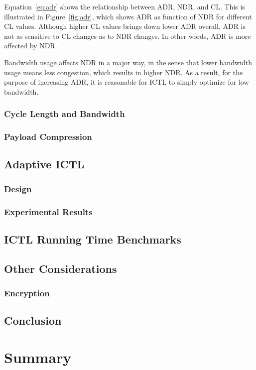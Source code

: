 \documentclass[12pt]{report}
\begin{document}
Equation~\ref{eq:adr} shows the relationship between ADR, NDR, and CL. This is illustrated in Figure~\ref{fig:adr}, which shows ADR as function of NDR for different CL values. Although higher CL values brings down lower ADR overall, ADR is not as sensitive to CL changes as to NDR changes. In other words, ADR is more affected by NDR.

Bandwidth usage affects NDR in a major way, in the sense that lower bandwidth usage means less congestion, which results in higher NDR. As a result, for the purpose of increasing ADR, it is reasonable for ICTL to simply optimize for low bandwidth.



\subsection{Cycle Length and Bandwidth}
\subsection{Payload Compression}

\section{Adaptive ICTL}

\subsection{Design}
\subsection{Experimental Results}

\section{ICTL Running Time Benchmarks}

\section{Other Considerations}

\subsection{Encryption}

\section{Conclusion}

\chapter{Summary}








\end{document}
